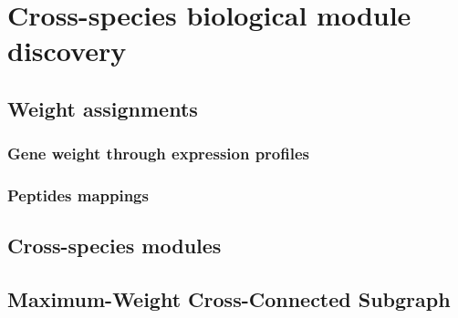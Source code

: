 \chapter{Cross-species biological module discovery}

\section{Weight assignments}

	\subsection{Gene weight through expression profiles}

	\subsection{Peptides mappings}

\section{Cross-species modules}

\section{Maximum-Weight Cross-Connected Subgraph}
